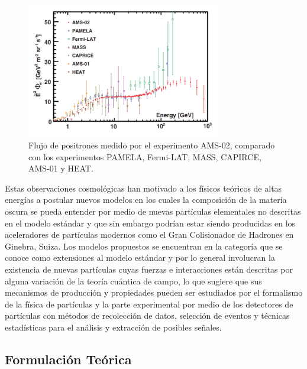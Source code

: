 \begin{figure}[ht!]
    \centering
    \includegraphics[width=0.75\textwidth]{Fisica_de_Particulas/imagenes/AMS_positronflux.png}
    \caption{Flujo de positrones medido por el experimento AMS-02, comparado con los experimentos PAMELA, Fermi-LAT, MASS, CAPIRCE, AMS-01 y HEAT.}
    \label{fig:AMS_positronflux}
\end{figure}

Estas observaciones cosmológicas han motivado a los físicos teóricos de altas energías a postular nuevos modelos en los cuales la composición de la materia oscura se pueda entender por medio de nuevas partículas elementales no descritas en el modelo estándar y que sin embargo podrían estar siendo producidas en los aceleradores de partículas modernos como el Gran Colisionador de Hadrones en Ginebra, Suiza. Los modelos propuestos se encuentran en la categoría que se conoce como extensiones al modelo estándar y por lo general involucran la existencia de nuevas partículas cuyas fuerzas e interacciones están descritas por alguna variación de la teoría cuántica de campo, lo que sugiere que sus mecanismos de producción y propiedades pueden ser estudiados por el formalismo de la física de partículas y la parte experimental por medio de los detectores de partículas con métodos de recolección de datos, selección de eventos y técnicas estadísticas para el análisis y extracción de posibles señales.

\subsection{Formulación Teórica}


